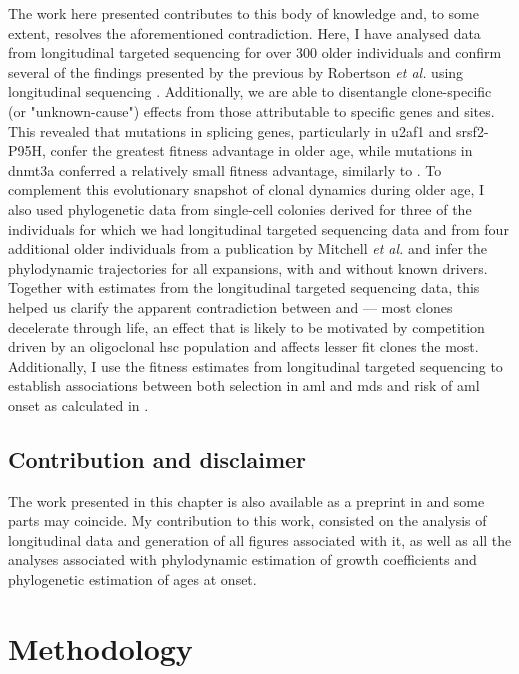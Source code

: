 The work here presented contributes to this body of knowledge and, to some extent, resolves the aforementioned contradiction. Here, I have analysed data from longitudinal targeted sequencing for over 300 older individuals and confirm several of the findings presented by the previous by Robertson \textit{et al.} using longitudinal sequencing \cite{Robertson2021-sw}. Additionally, we are able to disentangle clone-specific (or "unknown-cause") effects from those attributable to specific genes and sites. This revealed that mutations in splicing genes, particularly in \ac{u2af1} and \ac{srsf2}-P95H, confer the greatest fitness advantage in older age, while mutations in \ac{dnmt3a} conferred a relatively small fitness advantage, similarly to \cite{Robertson2021-sw}. To complement this evolutionary snapshot of clonal dynamics during older age, I also used phylogenetic data from single-cell colonies derived for three of the individuals for which we had longitudinal targeted sequencing data and from four additional older individuals from a publication by Mitchell \textit{et al.} \cite{Mitchell2021-zl} and infer the phylodynamic trajectories for all expansions, with and without known drivers. Together with estimates from the longitudinal targeted sequencing data, this helped us clarify the apparent contradiction between \cite{Robertson2021-sw} and \cite{Watson2020-pz} --- most clones decelerate through life, an effect that is likely to be motivated by competition driven by an oligoclonal \ac{hsc} population and affects lesser fit clones the most. Additionally, I use the fitness estimates from longitudinal targeted sequencing to establish associations between both selection in \ac{aml} and \ac{mds} and risk of \ac{aml} onset as calculated in \cite{Abelson2018-wh}.

\subsection{Contribution and disclaimer}

The work presented in this chapter is also available as a preprint in \cite{Fabre2021-uw} and some parts may coincide. My contribution to this work, consisted on the analysis of longitudinal data and generation of all figures associated with it, as well as all the analyses associated with phylodynamic estimation of growth coefficients and phylogenetic estimation of ages at onset.

\section{Methodology}

